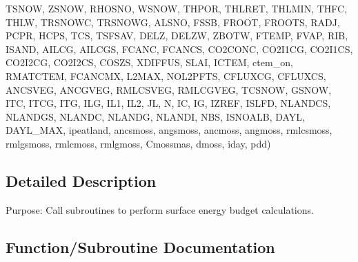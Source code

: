 \begin{DoxyCompactItemize}
T\+S\+N\+O\+W, Z\+S\+N\+O\+W, R\+H\+O\+S\+N\+O, W\+S\+N\+O\+W, T\+H\+P\+O\+R, T\+H\+L\+R\+E\+T, T\+H\+L\+M\+I\+N, T\+H\+F\+C, T\+H\+L\+W, T\+R\+S\+N\+O\+W\+C, T\+R\+S\+N\+O\+W\+G, A\+L\+S\+N\+O, F\+S\+S\+B, F\+R\+O\+O\+T, F\+R\+O\+O\+T\+S, R\+A\+D\+J, P\+C\+P\+R, H\+C\+P\+S, T\+C\+S, T\+S\+F\+S\+A\+V, D\+E\+L\+Z, D\+E\+L\+Z\+W, Z\+B\+O\+T\+W, F\+T\+E\+M\+P, F\+V\+A\+P, R\+I\+B, I\+S\+A\+N\+D, A\+I\+L\+C\+G, A\+I\+L\+C\+G\+S, F\+C\+A\+N\+C, F\+C\+A\+N\+C\+S, C\+O2\+C\+O\+N\+C, C\+O2\+I1\+C\+G, C\+O2\+I1\+C\+S, C\+O2\+I2\+C\+G, C\+O2\+I2\+C\+S, C\+O\+S\+Z\+S, X\+D\+I\+F\+F\+U\+S, S\+L\+A\+I, I\+C\+T\+E\+M, ctem\+\_\+on, R\+M\+A\+T\+C\+T\+E\+M, F\+C\+A\+N\+C\+M\+X, L2\+M\+A\+X, N\+O\+L2\+P\+F\+T\+S, C\+F\+L\+U\+X\+C\+G, C\+F\+L\+U\+X\+C\+S, A\+N\+C\+S\+V\+E\+G, A\+N\+C\+G\+V\+E\+G, R\+M\+L\+C\+S\+V\+E\+G, R\+M\+L\+C\+G\+V\+E\+G, T\+C\+S\+N\+O\+W, G\+S\+N\+O\+W, I\+T\+C, I\+T\+C\+G, I\+T\+G, I\+L\+G, I\+L1, I\+L2, J\+L, N, I\+C, I\+G, I\+Z\+R\+E\+F, I\+S\+L\+F\+D, N\+L\+A\+N\+D\+C\+S, N\+L\+A\+N\+D\+G\+S, N\+L\+A\+N\+D\+C, N\+L\+A\+N\+D\+G, N\+L\+A\+N\+D\+I, N\+B\+S, I\+S\+N\+O\+A\+L\+B, D\+A\+Y\+L, D\+A\+Y\+L\+\_\+\+M\+A\+X, ipeatland, ancsmoss, angsmoss, ancmoss, angmoss, rmlcsmoss, rmlgsmoss, rmlcmoss, rmlgmoss, Cmossmas, dmoss, iday, pdd)
\end{DoxyCompactItemize}


\subsection{Detailed Description}
Purpose\+: Call subroutines to perform surface energy budget calculations. 



\subsection{Function/\+Subroutine Documentation}
\hypertarget{CLASST_8f_afc821376816034a0c657e69bb4b06a24}{}
